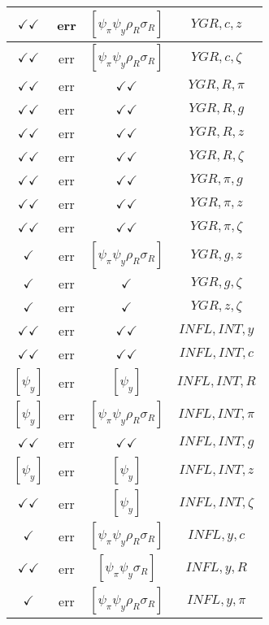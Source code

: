 \documentclass[a4paper,10pt]{article}
\begin{document}
\begin{longtable}{|c|c|c|c|}
\hline
$\checkmark\checkmark$ & err & $[\psi_\pi \psi_y \rho_R \sigma_R ]$ & ${YGR},{c},{z}$ \\
\hline
$\checkmark\checkmark$ & err & $[\psi_\pi \psi_y \rho_R \sigma_R ]$ & ${YGR},{c},{\zeta}$ \\
\hline
$\checkmark\checkmark$ & err & $\checkmark\checkmark$ & ${YGR},{R},{\pi}$ \\
\hline
$\checkmark\checkmark$ & err & $\checkmark\checkmark$ & ${YGR},{R},{g}$ \\
\hline
$\checkmark\checkmark$ & err & $\checkmark\checkmark$ & ${YGR},{R},{z}$ \\
\hline
$\checkmark\checkmark$ & err & $\checkmark\checkmark$ & ${YGR},{R},{\zeta}$ \\
\hline
$\checkmark\checkmark$ & err & $\checkmark\checkmark$ & ${YGR},{\pi},{g}$ \\
\hline
$\checkmark\checkmark$ & err & $\checkmark\checkmark$ & ${YGR},{\pi},{z}$ \\
\hline
$\checkmark\checkmark$ & err & $\checkmark\checkmark$ & ${YGR},{\pi},{\zeta}$ \\
\hline
$\checkmark$ & err & $[\psi_\pi \psi_y \rho_R \sigma_R ]$ & ${YGR},{g},{z}$ \\
\hline
$\checkmark$ & err & $\checkmark$ & ${YGR},{g},{\zeta}$ \\
\hline
$\checkmark$ & err & $\checkmark$ & ${YGR},{z},{\zeta}$ \\
\hline
$\checkmark\checkmark$ & err & $\checkmark\checkmark$ & ${INFL},{INT},{y}$ \\
\hline
$\checkmark\checkmark$ & err & $\checkmark\checkmark$ & ${INFL},{INT},{c}$ \\
\hline
$[\psi_y ]$ & err & $[\psi_y ]$ & ${INFL},{INT},{R}$ \\
\hline
$[\psi_y ]$ & err & $[\psi_\pi \psi_y \rho_R \sigma_R ]$ & ${INFL},{INT},{\pi}$ \\
\hline
$\checkmark\checkmark$ & err & $\checkmark\checkmark$ & ${INFL},{INT},{g}$ \\
\hline
$[\psi_y ]$ & err & $[\psi_y ]$ & ${INFL},{INT},{z}$ \\
\hline
$\checkmark\checkmark$ & err & $[\psi_y ]$ & ${INFL},{INT},{\zeta}$ \\
\hline
$\checkmark$ & err & $[\psi_\pi \psi_y \rho_R \sigma_R ]$ & ${INFL},{y},{c}$ \\
\hline
$\checkmark\checkmark$ & err & $[\psi_\pi \psi_y \sigma_R ]$ & ${INFL},{y},{R}$ \\
\hline
$\checkmark$ & err & $[\psi_\pi \psi_y \rho_R \sigma_R ]$ & ${INFL},{y},{\pi}$ \\

\end{longtable}
\end{document}
